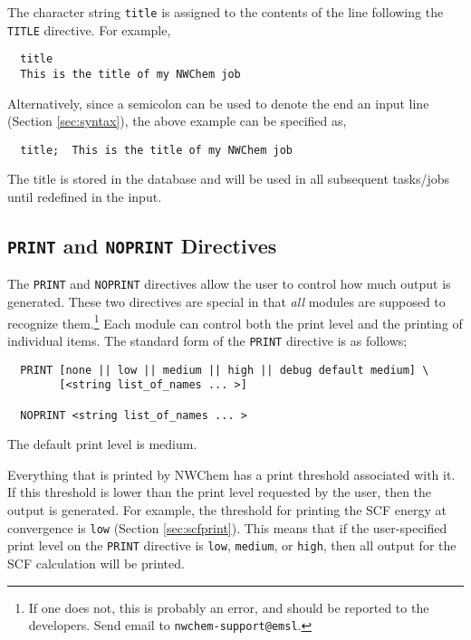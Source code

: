 The character string \verb+title+ is assigned to the contents of the
line following the \verb+TITLE+ directive.  For example,

\begin{verbatim}
  title
  This is the title of my NWChem job
\end{verbatim}

Alternatively, since a semicolon can be used to denote the end an input line
(Section \ref{sec:syntax}), the above example can be specified as,

\begin{verbatim}
  title;  This is the title of my NWChem job
\end{verbatim}

The title is stored in the database and will be used in all subsequent
tasks/jobs until redefined in the input.

\subsection{{\tt PRINT} and {\tt NOPRINT} Directives}
\label{sec:printcontrol}

The \verb+PRINT+ and \verb+NOPRINT+ directives allow the user to
control how much output is generated.  These two directives are
special in that {\em all} modules are supposed to recognize
them.\footnote{If one does not, this is probably an error, and should
  be reported to the developers.  Send email to
  \verb+nwchem-support@emsl+.} Each module can control both the print
level and the printing of individual items.  The standard form of the
\verb+PRINT+ directive is as follows;

\begin{verbatim}
  PRINT [none || low || medium || high || debug default medium] \
        [<string list_of_names ... >]

  NOPRINT <string list_of_names ... >
\end{verbatim}
The default print level is medium.

Everything that is printed by NWChem has a print threshold associated
with it. If this threshold is lower than the print level requested by
the user, then the output is generated.  For example, the threshold
for printing the SCF energy at convergence is \verb+low+ (Section
\ref{sec:scfprint}).  This means that if the user-specified print level 
on the \verb+PRINT+ directive is
\verb+low+, \verb+medium+, or \verb+high+, then all output for the
SCF calculation will be printed.  

